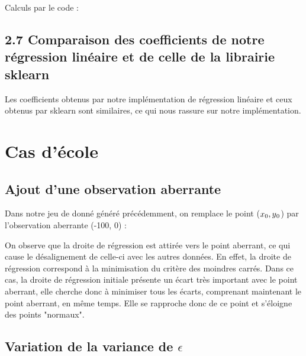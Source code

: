 \documentclass[paper=a4, fontsize=11pt]{scrartcl} %
\numberwithin{equation}{section} %
\numberwithin{figure}{section} %
\numberwithin{table}{section} %
\begin{document}
	Calculs par le code :
	\begin{center}
		\end{center}

	\subsection*{2.7 Comparaison des coefficients de notre régression linéaire et de celle de la librairie sklearn}
		\begin{center}
		\end{center}
		Les coefficients obtenus par notre implémentation de régression linéaire et ceux obtenus par sklearn sont similaires, ce qui nous rassure sur notre implémentation.

\newpage
\section{Cas d'école}

\subsection{Ajout d'une observation aberrante}
	Dans notre jeu de donné généré précédemment, on remplace le point ($x\textsubscript{0}, y\textsubscript{0}$) par l'observation aberrante (-100, 0) :
	\begin{center}
	\end{center}

On observe que la droite de régression est attirée vers le point aberrant, ce qui cause le désalignement de celle-ci avec les autres données. En effet, la droite de régression correspond à la minimisation du critère des moindres carrés. Dans ce cas, la droite de régression initiale présente un écart très important avec le point aberrant, elle cherche donc à minimiser tous les écarts, comprenant maintenant le point aberrant, en même temps. Elle se rapproche donc de ce point et s'éloigne des points "normaux".
\newpage
\subsection{Variation de la variance de $\epsilon$}
\end{document}
